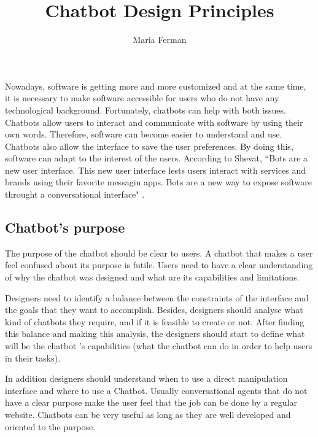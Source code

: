 \documentclass[a4paper,10pt]{article}
\title{Chatbot Design Principles}
\author{Maria Ferman}
\begin{document}
\maketitle
Nowadays, software is getting more and more customized and at the same time, it is necessary to make software accessible for users who do not have any technological background. Fortunately, chatbots can help with both issues. Chatbots allow users to interact and communicate with software by using their own words. Therefore, software can become easier to understand and use. Chatbots also allow the interface to save the user preferences. By doing this, software can adapt to the interest of the users. According to Shevat,  ``Bots are a new user interface. This new user interface lests users interact with services and brands using their favorite messagin apps. Bots are a new way to expose software throught a conversational interface" \cite{Shevat2017}. 

\subsection*{Chatbot's purpose}

The purpose of the chatbot should be clear to users. A chatbot that makes a user feel confused about its purpose is futile. Users need to have a clear understanding of why the chatbot was designed and what are its capabilities and limitations. 

Designers need to identify a balance between the constraints of the interface and the goals that they want to accomplish. Besides, designers should analyse what kind of chatbots they require, and if it is feasible to create or not. After finding this balance and making this analysis, the designers should start to define what will be the chatbot 's capabilities (what the chatbot can do in order to help users in their tasks). 

In addition designers should understand when to use a direct manipulation interface and where to use a Chatbot. Usually conversational agents that do not have a clear purpose make the user feel that the job can be done by a regular website. Chatbots can be very useful as long as they are well developed and oriented to the purpose. %
\end{document}
